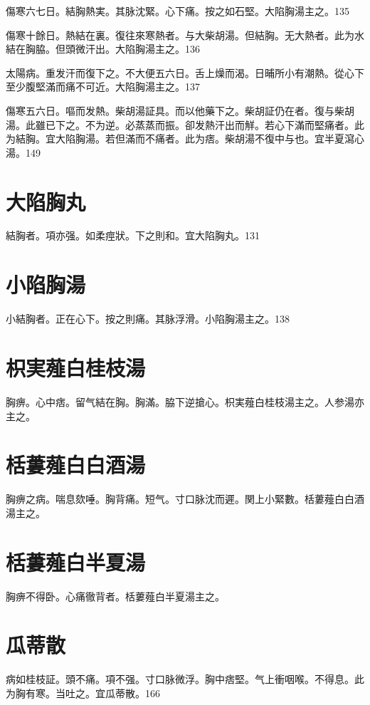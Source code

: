 \documentclass[12pt,twoside,UTF8,b5paper]{ctexbook}
\begin{document}
傷寒六七日。結胸熱実。其脉沈緊。心下痛。按之如石堅。大陷胸湯主之。135

傷寒十餘日。熱結在裏。復往來寒熱者。与大柴胡湯。但結胸。无大熱者。此为水結在胸脇。{但}頭微汗出。大陷胸湯主之。136

太陽病。重发汗而復下之。不大便五六日。舌上燥而渴。日晡所小有潮熱。從心下至少腹堅滿而痛不可近。大陷胸湯主之。137

傷寒五六日。嘔而发熱。柴胡湯証具。而以他藥下之。柴胡証仍在者。復与柴胡湯。此雖已下之。不为逆。必蒸蒸而振。卻发熱汗出而觧。若心下滿而堅痛者。此为結胸。宜大陷胸湯。若但滿而不痛者。此为痞。柴胡{湯}不復中与也。宜半夏瀉心湯。149

\section{大陷胸丸}

結胸者。項亦强。如柔痙狀。下之則和。宜大陷胸丸。131

\section{小陷胸湯}

小結胸者。正在心下。按之則痛。其脉浮滑。小陷胸湯主之。138

\section{枳実薤白桂枝湯}

胸痹。心中痞。留气結在胸。胸滿。脇下逆搶心。枳実薤白桂枝湯主之。人参湯亦主之。

\section{栝蔞薤白白酒湯}

胸痹之病。喘息欬唾。胸背痛。短气。寸口脉沈而遲。関上小緊數。栝蔞薤白白酒湯主之。

\section{栝蔞薤白半夏湯}

胸痹不得卧。心痛徹背者。栝蔞薤白半夏湯主之。

\section{瓜蒂散}

病如桂枝証。頭不痛。項不强。寸{口}脉微浮。胸中痞堅。气上衝咽喉。不得息。此为胸有寒。当吐之。宜瓜蒂散。166
\end{document}
